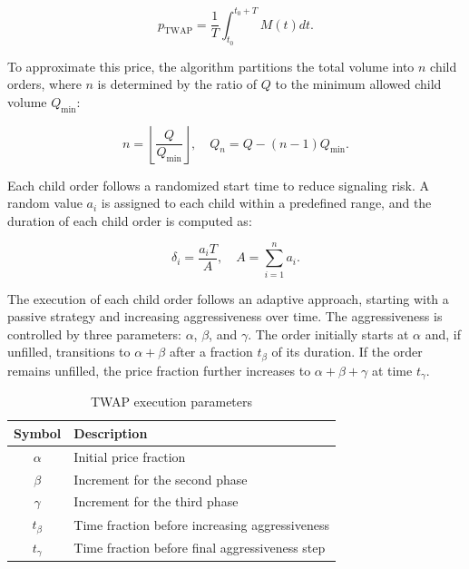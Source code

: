 \begin{equation}
    p_{\text{TWAP}} = \frac{1}{T} \int_{t_0}^{t_0+T} M(t) dt.
    \label{eq: TWQP price}
\end{equation}

To approximate this price, the algorithm partitions the total volume into $n$ child orders, where $n$ is determined by the ratio of $Q$ to the minimum allowed child volume $Q_{\min}$:

\begin{equation}
    n = \left\lfloor \frac{Q}{Q_{\min}} \right\rfloor, \quad Q_n = Q - (n-1) Q_{\min}.
    \label{eq: Q_n}
\end{equation}

Each child order follows a randomized start time to reduce signaling risk. A random value $a_i$ is assigned to each child within a predefined range, and the duration of each child order is computed as:

\begin{equation}
    \delta_i = \frac{a_i T}{A}, \quad A = \sum_{i=1}^{n} a_i.
    \label{eq:sigma and A}
\end{equation}

The execution of each child order follows an adaptive approach, starting with a passive strategy and increasing aggressiveness over time. The aggressiveness is controlled by three parameters: $\alpha$, $\beta$, and $\gamma$. The order initially starts at $\alpha$ and, if unfilled, transitions to $\alpha + \beta$ after a fraction $t_{\beta}$ of its duration. If the order remains unfilled, the price fraction further increases to $\alpha + \beta + \gamma$ at time $t_{\gamma}$.

\begin{table}[h]
    \centering
    \begin{tabular}{|c|l|}
        \hline
        \textbf{Symbol} & \textbf{Description} \\ \hline
        $\alpha$ & Initial price fraction \\ \hline
        $\beta$ & Increment for the second phase \\ \hline
        $\gamma$ & Increment for the third phase \\ \hline
        $t_{\beta}$ & Time fraction before increasing aggressiveness \\ \hline
        $t_{\gamma}$ & Time fraction before final aggressiveness step \\ \hline
    \end{tabular} \label{tb:TWAP parameters}
    \caption{TWAP execution parameters}
\end{table}

